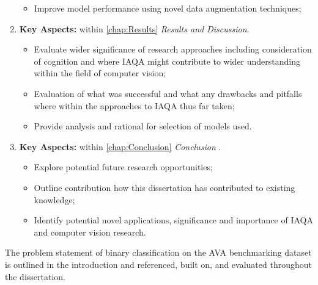 \begin{enumerate}
\begin{itemize}
        \item Improve model performance using novel data augmentation techniques;
        \end{itemize}
    \item \textbf{Key Aspects:} within \ref{chap:Results} \emph{Results and Discussion}.
        \begin{itemize}
            \item Evaluate wider significance of research approaches including consideration of cognition and where IAQA might contribute to wider understanding within the field of computer vision;
            \item Evaluation of what was successful and what any drawbacks and pitfalls where within the approaches to IAQA thus far taken;
            \item Provide analysis and rational for selection of models used.
        \end{itemize}
     \item \textbf{Key Aspects:} within \ref{chap:Conclusion} \emph{Conclusion} .
        \begin{itemize}
            \item Explore potential future research opportunities;
            \item Outline contribution how this dissertation has contributed to existing knowledge;
            \item Identify potential novel applications, significance and importance of IAQA and computer vision research. 
        \end{itemize}
    
\end{enumerate}

The problem statement of binary classification on the AVA benchmarking dataset is outlined in the introduction and referenced, built on, and evaluated throughout the dissertation. 



